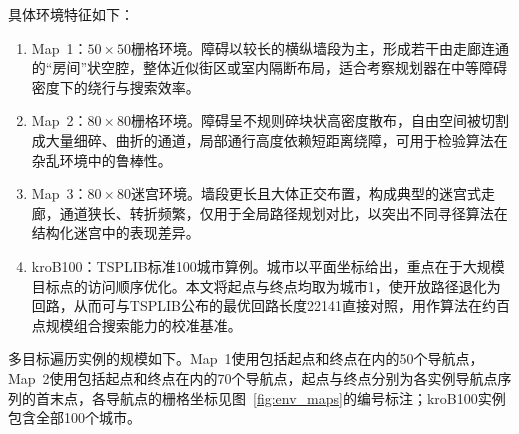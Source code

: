 \documentclass[lettersize,journal]{IEEEtran}
\begin{document}
具体环境特征如下：

\begin{enumerate}

\item Map~1：$50\times 50$栅格环境。障碍以较长的横纵墙段为主，形成若干由走廊连通的“房间”状空腔，整体近似街区或室内隔断布局，适合考察规划器在中等障碍密度下的绕行与搜索效率。

\item Map~2：$80\times 80$栅格环境。障碍呈不规则碎块状高密度散布，自由空间被切割成大量细碎、曲折的通道，局部通行高度依赖短距离绕障，可用于检验算法在杂乱环境中的鲁棒性。

\item Map~3：$80\times 80$迷宫环境。墙段更长且大体正交布置，构成典型的迷宫式走廊，通道狭长、转折频繁，仅用于全局路径规划对比，以突出不同寻径算法在结构化迷宫中的表现差异。

\item kroB100：TSPLIB标准100城市算例。城市以平面坐标给出，重点在于大规模目标点的访问顺序优化。本文将起点与终点均取为城市1，使开放路径退化为回路，从而可与TSPLIB公布的最优回路长度22141直接对照，用作算法在约百点规模组合搜索能力的校准基准。

\end{enumerate}

多目标遍历实例的规模如下。Map~1使用包括起点和终点在内的50个导航点，Map~2使用包括起点和终点在内的70个导航点，起点与终点分别为各实例导航点序列的首末点，各导航点的栅格坐标见图~\textcolor{blue}{\ref{fig:env_maps}}的编号标注；kroB100实例包含全部100个城市。
\end{document}
